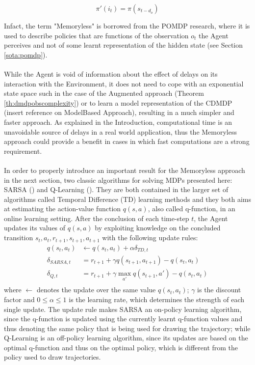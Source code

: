                 \[ \pi'(i_t) = \pi(s_{t-d_o}) \]
                
                Infact, the term "Memoryless" is borrowed from the POMDP research, where it is used to describe policies that are functions of the observation $o_t$ the Agent perceives and not of some learnt representation of the hidden state (see Section \ref{sota:pomdp}).
                \\\\
                While the Agent is void of information about the effect of delays on its interaction with the Environment, it does not need to cope with an exponential state space such in the case of the Augmented approach (Theorem \ref{th:dmdpobscomplexity}) or to learn a model representation of the CDMDP (\color{red}insert reference on ModelBased Approach\color{black}), resulting in a much simpler and faster approach. As explained in the Introduction, computational time is an unavoidable source of delays in a real world application, thus the Memoryless approach could provide a benefit in cases in which fast computations are a strong requirement.
                \\\\
                In order to properly introduce an important result for the Memoryless approach in the next section, two classic algorithms for solving MDPs presented here: SARSA () and Q-Learning (). They are both contained in the larger set of algorithms called Temporal Difference (TD) learning methods and they both aims at estimating the action-value function $q(s,a)$, also called q-function, in an online learning setting. After the conclusion of each time-step $t$, the Agent updates its values of $q(s,a)$ by exploiting knowledge on the concluded transition $s_t, a_t, r_{t+1}, s_{t+1}, a_{t+1}$ with the following update rules:
                \begin{align*}
                    q(s_t, a_t) &\leftarrow q(s_t, a_t) + \alpha \delta_{TD, t}\\
                    \delta_{SARSA, t}    &= r_{t+1} + \gamma q(s_{t+1}, a_{t+1}) - q(s_t, a_t)\\
                    \delta_{Q, t}        &= r_{t+1} + \gamma \max_{a'} q(s_{t+1}, a') - q(s_t, a_t)\\
                \end{align*}
                where $\leftarrow$ denotes the update over the same value $q(s_t, a_t)$; $\gamma$ is the discount factor and $0 \leq \alpha \leq 1$ is the learning rate, which determines the strength of each single update. The update rule makes SARSA an on-policy learning algorithm, since the q-function is updated using the currently learnt q-function values and thus denoting the same policy that is being used for drawing the trajectory; while Q-Learning is an off-policy learning algorithm, since its updates are based on the optimal q-function and thus on the optimal policy, which is different from the policy used to draw trajectories. \newline
